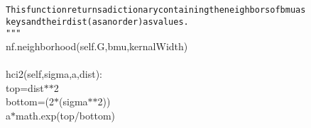 {{\begin{tabbing}
{\texttt{\hspace{48pt}This\hspace{6pt}function\hspace{6pt}returns\hspace{6pt}a\hspace{6pt}dictionary\hspace{6pt}containing\hspace{6pt}the\hspace{6pt}neighbors\hspace{6pt}of\hspace{6pt}bmu\hspace{6pt}as}}\\
{\texttt{\hspace{48pt}keys\hspace{6pt}and\hspace{6pt}their\hspace{6pt}dist\hspace{6pt}(as\hspace{6pt}an\hspace{6pt}order)\hspace{6pt}as\hspace{6pt}values.}}\\
{\texttt{\hspace{48pt}\string"}}{\texttt{\string"\string"}}\\
\hspace{6pt}nf.neighborhood(self.G,bmu,kernalWidth)\\
\\
\hspace{6pt}hci2(self,\hspace{6pt}sigma,\hspace{6pt}a,\hspace{6pt}dist):\\
\hspace{48pt}top\hspace{6pt}=\hspace{6pt}dist$\ast$$\ast$2\\
\hspace{48pt}bottom\hspace{6pt}=\hspace{6pt}(2$\ast$(sigma$\ast$$\ast$2))\\
\hspace{6pt}a\hspace{6pt}$\ast$\hspace{6pt}math.exp(\dash{}top/bottom)\\

\end{tabbing}}}
